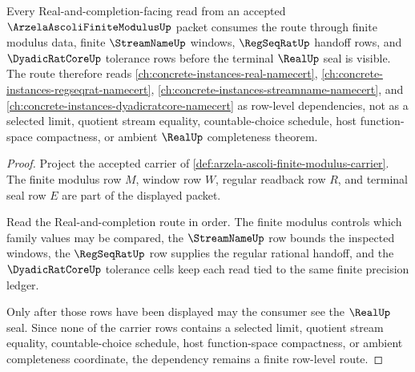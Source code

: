 \begin{theorem}
\label{thm:arzela-ascoli-finite-modulus-real-completion-dependency-route}
Every Real-and-completion-facing read from an accepted $\ArzelaAscoliFiniteModulusUp$ packet consumes the route through finite modulus data, finite $\StreamNameUp$ windows, $\RegSeqRatUp$ handoff rows, and $\DyadicRatCoreUp$ tolerance rows before the terminal $\RealUp$ seal is visible. The route therefore reads \autoref{ch:concrete-instances-real-namecert}, \autoref{ch:concrete-instances-regseqrat-namecert}, \autoref{ch:concrete-instances-streamname-namecert}, and \autoref{ch:concrete-instances-dyadicratcore-namecert} as row-level dependencies, not as a selected limit, quotient stream equality, countable-choice schedule, host function-space compactness, or ambient $\RealUp$ completeness theorem.
\end{theorem}
\begin{proof}
Project the accepted carrier of \autoref{def:arzela-ascoli-finite-modulus-carrier}. The finite modulus row $M$, window row $W$, regular readback row $R$, and terminal seal row $E$ are part of the displayed packet.

Read the Real-and-completion route in order. The finite modulus controls which family values may be compared, the $\StreamNameUp$ row bounds the inspected windows, the $\RegSeqRatUp$ row supplies the regular rational handoff, and the $\DyadicRatCoreUp$ tolerance cells keep each read tied to the same finite precision ledger.

Only after those rows have been displayed may the consumer see the $\RealUp$ seal. Since none of the carrier rows contains a selected limit, quotient stream equality, countable-choice schedule, host function-space compactness, or ambient completeness coordinate, the dependency remains a finite row-level route.
\end{proof}

